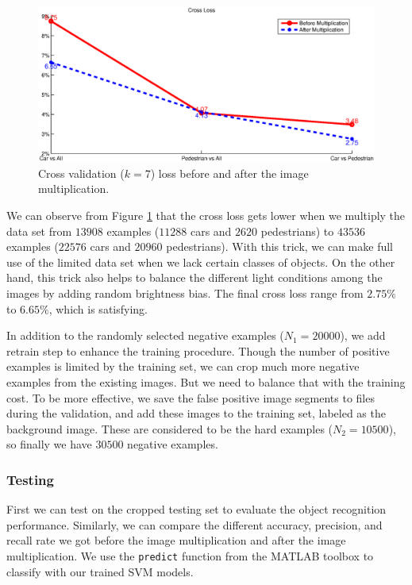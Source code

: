 \documentclass{article} %
\begin{document}
\begin{figure}[htb]
\begin{center}
\includegraphics[width=\textwidth]{crossloss.eps}
\end{center}
\caption{Cross validation ($k=7$) loss before and after the image multiplication.
\label{fig:crossloss}}
\end{figure}

We can observe from Figure \ref{fig:crossloss} that the cross loss gets lower when we multiply the data set from $13908$ examples ($11288$ cars and $2620$ pedestrians) to $43536$ examples ($22576$ cars and $20960$ pedestrians). With this trick, we can make full use of the limited data set when we lack certain classes of objects. On the other hand, this trick also helps to balance the different light conditions among the images by adding random brightness bias. The final cross loss range from $2.75\%$ to $6.65\%$, which is satisfying. 

In addition to the randomly selected negative examples ($N_1=20000$), we add retrain step to enhance the training procedure. Though the number of positive examples is limited by the training set, we can crop much more negative examples from the existing images. But we need to balance that with the training cost. To be more effective, we save the false positive image segments to files during the validation, and add these images to the training set, labeled as the background image. These are considered to be the hard examples ($N_2=10500$), so finally we have $30500$ negative examples.

\subsubsection{Testing}

First we can test on the cropped testing set to evaluate the object recognition performance. Similarly, we can compare the different accuracy, precision, and recall rate we got before the image multiplication and after the image multiplication. We use the \texttt{predict} function from the MATLAB toolbox to classify with our trained SVM models.
\end{document}
